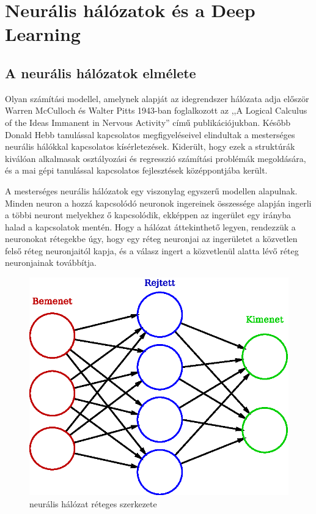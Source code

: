 \chapter{Neurális hálózatok és a Deep Learning}\label{chap:neuralis-halozatok-es-a-deep-learning}

\section{A neurális hálózatok elmélete}
\label{sect:neuralNetworkTheory}
Olyan számítási modellel, amelynek alapját az idegrendszer hálózata adja először  Warren McCulloch és Walter Pitts 1943-ban foglalkozott az ,,A Logical Calculus of the Ideas Immanent in Nervous Activity'' című publikációjukban. Később Donald Hebb tanulással kapcsolatos megfigyeléseivel elindultak a mesterséges neurális hálókkal kapcsolatos kísérletezések.\cite{neural2006}\cite{nielsen2015}
Kiderült, hogy ezek a struktúrák kiválóan alkalmasak osztályozási és regresszió számítási problémák megoldására, és a mai gépi tanulással kapcsolatos fejlesztések középpontjába került.

A mesterséges neurális hálózatok egy viszonylag egyszerű modellen alapulnak. Minden neuron a hozzá kapcsolódó neuronok ingereinek összessége alapján ingerli a többi neuront melyekhez ő kapcsolódik, ekképpen az ingerület egy irányba halad a kapcsolatok mentén. Hogy a hálózat áttekinthető legyen, rendezzük a neuronokat rétegekbe úgy, hogy egy réteg neuronjai az ingerületet a közvetlen felső réteg neuronjaitól kapja, és a válasz ingert a közvetlenül alatta lévő réteg neuronjainak továbbítja.

\begin{figure}[h]
	\centering
	\includegraphics[width=0.3\columnwidth]{fig/neural_network}
	\caption{neurális hálózat réteges szerkezete \protect \footnotemark}
	\label{fig:neuralNet}
\end{figure}

